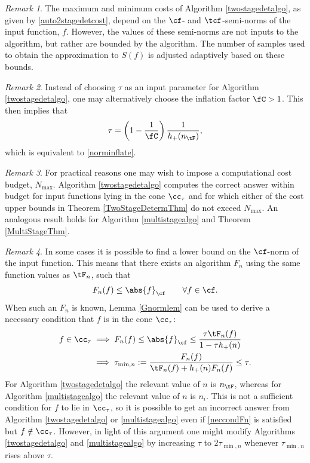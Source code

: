 \documentclass[]{elsarticle}
\theoremstyle{definition}
\theoremstyle{remark}
\newtheorem{rem}{Remark}
\newcommand{\Fnorm}[1]{\abs{#1}_{\cf}}
\begin{document}
\begin{rem} The maximum and minimum costs of Algorithm \ref{twostagedetalgo}, as given by \eqref{auto2stagedetcost}, depend on the $\cf$- and $\tcf$-semi-norms of the input function, $f$.  However, the values of these semi-norms are not inputs to the algorithm, but rather are bounded by the algorithm.  The number of samples used to obtain the approximation to $S(f)$ is adjusted adaptively based on these bounds.
\end{rem}

\begin{rem} Instead of choosing $\tau$ as an input parameter for Algorithm \ref{twostagedetalgo}, one may alternatively choose the inflation factor $\fC >1$.  This then implies that 
\begin{equation*} \label{taufromnC}
\tau = \left(1 - \frac{1}{\fC}\right)\frac{1}{h_{+}(n_{\tF})},
\end{equation*}
which is equivalent to \eqref{norminflate}.
\end{rem}

\begin{rem} \label{Nmaxrem}  For practical reasons one may wish to impose a computational cost budget, $N_{\max}$.  Algorithm \ref{twostagedetalgo} computes the correct answer within  budget for input functions lying in the cone $\cc_{\tau}$ and for which either of the cost upper bounds in Theorem \ref{TwoStageDetermThm} do not exceed $N_{\max}$.  An analogous result holds for Algorithm \ref{multistagealgo} and Theorem \ref{MultiStageThm}.
\end{rem}

\begin{rem} \label{neccondrem} In some cases it is possible to find a lower bound on the $\cf$-norm of the input function.  This means that there exists an algorithm $F_n$ using the same function values as $\tF_n$, such that
\[
F_n(f) \le \Fnorm{f} \qquad \forall f \in \cf.
\]
When such an $F_n$ is known, Lemma \ref{Gnormlem} can be used to derive a necessary condition that $f$ is in the cone $\cc_\tau$:
\begin{align}
\nonumber
f \in \cc_\tau 
& \implies F_n(f) \le \Fnorm{f} \le \frac{\tau \tF_n(f)}{1-\tau h_+(n)}\\
& \implies \tau_{\min,n}:= \frac{F_n(f)}{\tF_n(f) + h_+(n) F_n(f)} \le \tau.
\label{neccondFn}
\end{align}
For Algorithm \ref{twostagedetalgo} the relevant value of $n$ is $n_{\tF}$, whereas for Algorithm \ref{multistagealgo} the relevant value of $n$ is $n_i$.
This is not a sufficient condition for $f$ to lie in $\cc_{\tau}$, so it is possible to get an incorrect answer from Algorithm \ref{twostagedetalgo} or \ref{multistagealgo} even if \eqref{neccondFn} is satisfied but $f \notin \cc_{\tau}$.  However, in light of this argument one might modify Algorithms \ref{twostagedetalgo} and \ref{multistagealgo} by increasing $\tau$ to $2 \tau_{\min,n}$ whenever  $\tau_{\min,n}$ rises above $\tau$. 
\end{rem}
\end{document}
